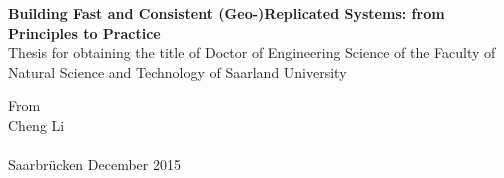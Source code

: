 \begin{center}
{\Huge \textbf{\textsf{Building Fast and Consistent (Geo-)Replicated Systems: from Principles to Practice}}} \\[4em]

{\huge \textsf{Thesis for obtaining the title of Doctor of Engineering Science of the Faculty
of Natural Science and Technology of Saarland University}} \\[2em]%
\end{center}
\begin{center}
{\LARGE From}\\[1em]
{\LARGE \textsf{Cheng Li}}
~\\
~\\
Saarbr\"ucken
December 2015
\end{center}
\fi
